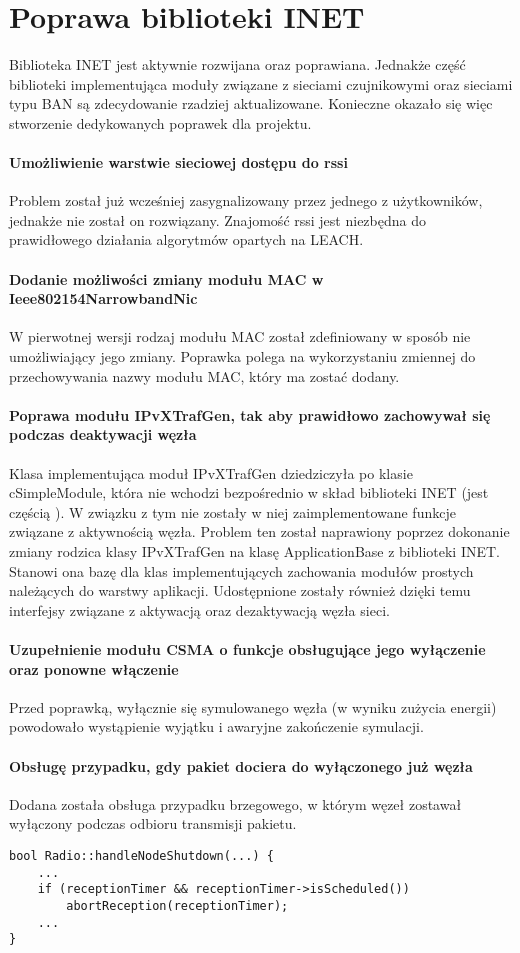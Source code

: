 \section{Poprawa biblioteki INET}
Biblioteka INET jest aktywnie rozwijana oraz poprawiana. Jednakże część biblioteki implementująca moduły związane z sieciami czujnikowymi oraz sieciami typu BAN są zdecydowanie rzadziej aktualizowane. Konieczne okazało się więc stworzenie dedykowanych poprawek dla projektu.

\paragraph{Umożliwienie warstwie sieciowej dostępu do rssi} Problem został już wcześniej zasygnalizowany przez jednego z użytkowników, jednakże nie został on rozwiązany. Znajomość rssi jest niezbędna do prawidłowego działania algorytmów opartych na LEACH.

\paragraph{Dodanie możliwości zmiany modułu MAC w Ieee802154NarrowbandNic} W pierwotnej wersji rodzaj modułu MAC został zdefiniowany w sposób nie umożliwiający jego zmiany. Poprawka polega na wykorzystaniu zmiennej do przechowywania nazwy modułu MAC, który ma zostać dodany.

\paragraph{Poprawa modułu IPvXTrafGen, tak aby prawidłowo zachowywał się podczas deaktywacji węzła} Klasa implementująca moduł IPvXTrafGen dziedziczyła po klasie cSimpleModule, która nie wchodzi bezpośrednio w skład biblioteki INET (jest częścią \omnetpp). W związku z tym nie zostały w niej zaimplementowane funkcje związane z aktywnością węzła. Problem ten został naprawiony poprzez dokonanie zmiany rodzica klasy IPvXTrafGen na klasę ApplicationBase z biblioteki INET. Stanowi ona bazę dla klas implementujących zachowania modułów prostych należących do warstwy aplikacji. Udostępnione zostały również dzięki temu interfejsy związane z aktywacją oraz dezaktywacją węzła sieci.

\paragraph{Uzupełnienie modułu CSMA o funkcje obsługujące jego wyłączenie oraz ponowne włączenie} Przed poprawką, wyłącznie się symulowanego węzła (w wyniku zużycia energii) powodowało wystąpienie wyjątku i awaryjne zakończenie symulacji.

\paragraph{Obsługę przypadku, gdy pakiet dociera do wyłączonego już węzła} Dodana została obsługa przypadku brzegowego, w którym węzeł zostawał wyłączony podczas odbioru transmisji pakietu.
\begin{verbatim}
bool Radio::handleNodeShutdown(...) {
    ...
    if (receptionTimer && receptionTimer->isScheduled())
        abortReception(receptionTimer);
    ...
}
\end{verbatim}
